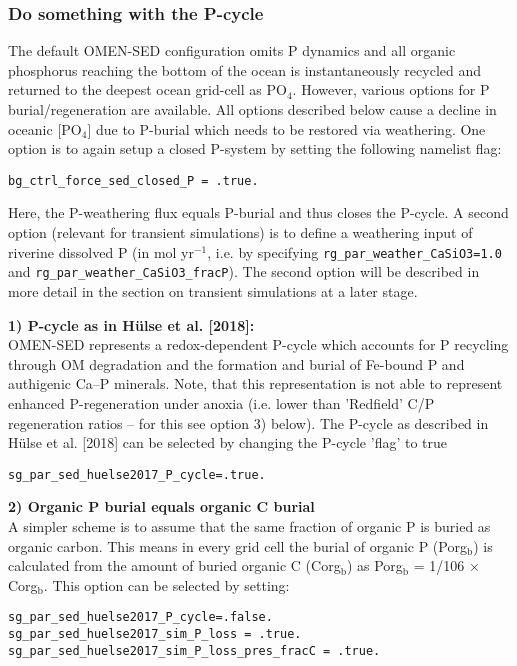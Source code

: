 \documentclass[11pt,fleqn]{book} %
\begin{document}
%
\subsubsection*{Do something with the P-cycle}

The default OMEN-SED configuration omits P dynamics and all organic phosphorus reaching the bottom of the ocean is instantaneously recycled and returned to the deepest ocean grid-cell as PO$_4$. 
However, various options for P burial/regeneration are available. All options described below cause a decline in oceanic [PO$_4$] due to P-burial which needs to be restored via weathering. One option is to again setup a closed P-system by setting the following namelist flag:
\vspace{-1mm}\begin{verbatim}
bg_ctrl_force_sed_closed_P = .true.
\end{verbatim}\vspace{-1mm}
Here, the P-weathering flux equals P-burial and thus closes the P-cycle. A second option (relevant for transient simulations) is to define a weathering input of riverine dissolved P (in mol yr$^{-1}$, i.e. by specifying 
\texttt{rg\_par\_weather\_CaSiO3=1.0} and \texttt{rg\_par\_weather\_CaSiO3\_fracP}). The second option will be described in more detail in the section on transient simulations at a later stage. 

\vspace{1mm}
\noindent 
\textbf{1) P-cycle as in H\"ulse et al. [2018]:}\\
OMEN-SED represents a redox-dependent P-cycle which accounts for P recycling through OM degradation and the formation and burial of Fe-bound P and authigenic Ca--P minerals. Note, that this representation is not able to represent enhanced P-regeneration under anoxia (i.e. lower than 'Redfield' C/P regeneration ratios -- for this see option 3) below). The P-cycle as described in H\"ulse et al. [2018] can be selected by changing the P-cycle 'flag' to true
\vspace{-1mm}\begin{verbatim}
sg_par_sed_huelse2017_P_cycle=.true.
\end{verbatim}\vspace{-1mm}

\vspace{1mm}
\noindent 
\textbf{2) Organic P burial equals organic C burial}\\
A simpler scheme is to assume that the same fraction of organic P is buried as organic carbon. This means in every grid cell the burial of organic P (Porg$_\mathrm{b}$) is calculated from the amount of buried organic C (Corg$_\mathrm{b}$) as 
Porg$_\mathrm{b}$ = 1/106 $\times$ Corg$_\mathrm{b}$. This option can be selected by setting:
\vspace{-1mm}\begin{verbatim}
sg_par_sed_huelse2017_P_cycle=.false.
sg_par_sed_huelse2017_sim_P_loss = .true.
sg_par_sed_huelse2017_sim_P_loss_pres_fracC = .true.
\end{verbatim}\vspace{-1mm}
 
\end{document}

